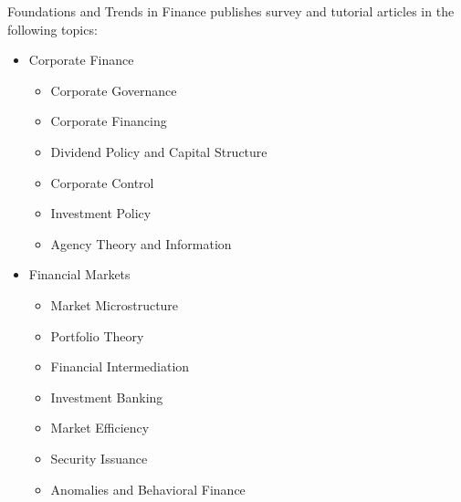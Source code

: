 


\journalaimsandscope
 {%
  Foundations and Trends\textsuperscript{\textregistered} in
Finance publishes
 survey and tutorial articles in the following topics: 
\begin{multicols}{2}\raggedcolumns
\begin{itemize}
\item{Corporate Finance}
\begin{itemize}
\item{Corporate Governance}
\item{Corporate Financing}
\item{Dividend Policy and Capital Structure}
\item{Corporate Control}
\item{Investment Policy}
\item{Agency Theory and Information}
\end{itemize}
\end{itemize}
\columnbreak
\begin{itemize}
\item{Financial Markets}
\begin{itemize}
\item{Market Microstructure}
\item{Portfolio Theory}
\item{Financial Intermediation}
\item{Investment Banking}
\item{Market Efficiency}
\item{Security Issuance}
\item{Anomalies and Behavioral Finance}
\end{itemize}
\end{itemize}
\end{multicols}
\begin{multicols}{2}\raggedcolumns
\begin{itemize}

\end{itemize}
\end{multicols}}
